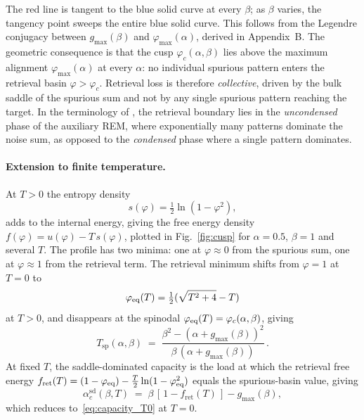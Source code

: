 \documentclass[letterpaper]{article} %
\newcommand{\Bnet}{\beta}
\newcommand{\fret}{f_{\mathrm{ret}}}
\newcommand{\gmax}{g_{\max}}
\newcommand{\acSd}{\alpha_c^{\mathrm{sd}}}
\begin{document}
The red line is tangent to the blue solid curve at every $\Bnet$; as $\Bnet$
varies, the tangency point sweeps the entire blue solid curve. This follows from
the Legendre conjugacy between $g_{\max}(\Bnet)$ and $\varphi_{\max}(\alpha)$,
derived in Appendix~B. The geometric consequence is that the cusp
$\varphi_c(\alpha, \Bnet)$ lies above the maximum alignment $\varphi_{\max}(\alpha)$
at every $\alpha$: no individual spurious pattern enters the retrieval basin
$\varphi > \varphi_c$. Retrieval loss is therefore \textit{collective}, driven by
the bulk saddle of the spurious sum and not by any single spurious pattern
reaching the target. In the terminology of \citet{lucibello2024exponential}, the
retrieval boundary lies in the \textit{uncondensed} phase of the auxiliary REM,
where exponentially many patterns dominate the noise sum, as opposed to the
\textit{condensed} phase where a single pattern dominates.

\paragraph{Extension to finite temperature.}
At $T > 0$ the entropy density~\citep{icml2026theory}
\begin{equation}
    s(\varphi) = \tfrac{1}{2} \ln(1 - \varphi^2),
    \label{eq:entropy}
\end{equation}
adds to the internal energy, giving the free energy density
$f(\varphi) = u(\varphi) - T\,s(\varphi)$, plotted in Fig.~\ref{fig:cusp} for
$\alpha = 0.5$, $\Bnet = 1$ and several $T$. The profile has two minima: one at
$\varphi \approx 0$ from the spurious sum, one at $\varphi \approx 1$ from the
retrieval term. The retrieval minimum shifts from $\varphi = 1$ at $T = 0$ to
\begin{equation}
    \varphi_{\rm eq}(T) = \tfrac{1}{2}(\sqrt{T^2 + 4} - T)
    \label{eq:phi_eq}
\end{equation}
at $T > 0$, and disappears at the spinodal
$\varphi_{\rm eq}(T) = \varphi_c(\alpha, \Bnet)$, giving
\begin{equation}
    T_{\mathrm{sp}}(\alpha, \Bnet) \;=\; \frac{\Bnet^2 - (\alpha + \gmax(\Bnet))^2}
              {\Bnet\,(\alpha + \gmax(\Bnet))}\,.
    \label{eq:spinodal}
\end{equation}
At fixed $T$, the saddle-dominated capacity is the load at which the
retrieval free energy
$\fret(T) = (1 - \varphi_{\rm eq}) - \tfrac{T}{2}\ln(1 - \varphi_{\rm eq}^2)$
equals the spurious-basin value, giving
\begin{equation}
    \acSd(\Bnet, T) \;=\; \Bnet\,[\,1 - \fret(T)\,] - g_{\max}(\Bnet),
    \label{eq:capacity_T}
\end{equation}
which reduces to~\eqref{eq:capacity_T0} at $T = 0$.
\end{document}
